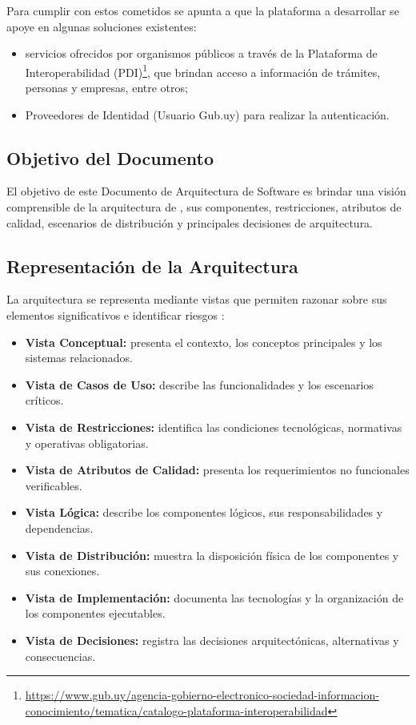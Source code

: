 Para cumplir con estos cometidos se apunta a que la plataforma a desarrollar se apoye en algunas soluciones existentes:

\begin{itemize}
    \item servicios ofrecidos por organismos públicos a través de la Plataforma de Interoperabilidad (PDI)\footnote{\raggedright\url{https://www.gub.uy/agencia-gobierno-electronico-sociedad-informacion-conocimiento/tematica/catalogo-plataforma-interoperabilidad}}, que brindan acceso a información de trámites, personas y empresas, entre otros;
    \item Proveedores de Identidad (Usuario Gub.uy) para realizar la autenticación.
\end{itemize}

\subsection{Objetivo del Documento}

El objetivo de este Documento de Arquitectura de Software es brindar una visión comprensible de la arquitectura de \solucion, sus componentes, restricciones, atributos de calidad, escenarios de distribución y principales decisiones de arquitectura.

\subsection{Representación de la Arquitectura}

La arquitectura se representa mediante vistas que permiten razonar sobre sus elementos significativos e identificar riesgos \cite{Kruchten1995,Perovich2003}:

\begin{itemize}
    \item \textbf{Vista Conceptual:} presenta el contexto, los conceptos principales y los sistemas relacionados.
    \item \textbf{Vista de Casos de Uso:} describe las funcionalidades y los escenarios críticos.
    \item \textbf{Vista de Restricciones:} identifica las condiciones tecnológicas, normativas y operativas obligatorias.
    \item \textbf{Vista de Atributos de Calidad:} presenta los requerimientos no funcionales verificables.
    \item \textbf{Vista Lógica:} describe los componentes lógicos, sus responsabilidades y dependencias.
    \item \textbf{Vista de Distribución:} muestra la disposición física de los componentes y sus conexiones.
    \item \textbf{Vista de Implementación:} documenta las tecnologías y la organización de los componentes ejecutables.
    \item \textbf{Vista de Decisiones:} registra las decisiones arquitectónicas, alternativas y consecuencias.
\end{itemize}

